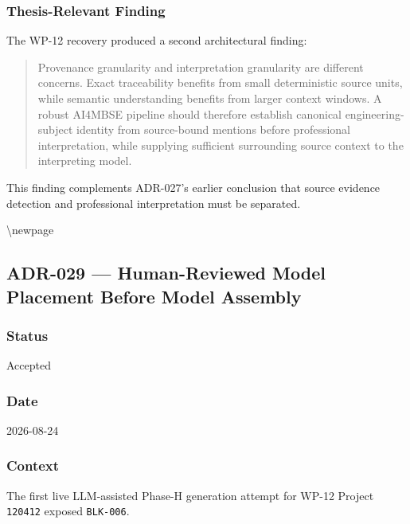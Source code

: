 \hypertarget{thesis-relevant-finding}{%
\subsubsection{Thesis-Relevant Finding}\label{thesis-relevant-finding}}

The WP-12 recovery produced a second architectural finding:

\begin{quote}
Provenance granularity and interpretation granularity are different concerns. Exact traceability benefits from small deterministic source units, while semantic understanding benefits from larger context windows. A robust AI4MBSE pipeline should therefore establish canonical engineering-subject identity from source-bound mentions before professional interpretation, while supplying sufficient surrounding source context to the interpreting model.
\end{quote}

This finding complements ADR-027's earlier conclusion that source evidence detection and professional interpretation must be separated.

\textbackslash newpage

\hypertarget{adr-029--human-reviewed-model-placement-before-model-assembly}{%
\subsection{ADR-029 --- Human-Reviewed Model Placement Before Model Assembly}\label{adr-029--human-reviewed-model-placement-before-model-assembly}}

\hypertarget{status-10}{%
\subsubsection{Status}\label{status-10}}

Accepted

\hypertarget{date-10}{%
\subsubsection{Date}\label{date-10}}

2026-08-24

\hypertarget{context-15}{%
\subsubsection{Context}\label{context-15}}

The first live LLM-assisted Phase-H generation attempt for WP-12 Project \texttt{120412} exposed \texttt{BLK-006}.

